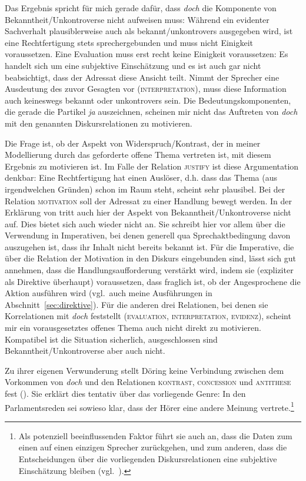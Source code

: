 {Das Ergebnis spricht für mich gerade dafür, dass \textit{doch} die Komponente von Bekanntheit/Unkontroverse nicht aufweisen muss: Während ein evidenter Sach\-verhalt plausiblerweise auch als bekannt/unkontrovers ausgegeben wird, ist eine Rechtfertigung stets sprechergebunden und muss nicht Einigkeit voraussetzen. Eine Evaluation muss erst recht keine Einigkeit voraussetzen: Es handelt sich um eine subjektive Einschätzung und es ist auch gar nicht beabsichtigt, dass der Adressat diese Ansicht teilt. Nimmt der Sprecher eine Ausdeutung des zuvor Gesagten vor (\textsc{interpretation}), muss diese Information auch keineswegs bekannt oder unkontrovers sein. Die Bedeutungskomponenten, die gerade die Partikel \textit{ja} auszeichnen, scheinen mir nicht das Auftreten von \textit{doch} mit den ge\-nannten Diskursrelationen zu motivieren. 

Die Frage ist, ob der Aspekt von Widerspruch/Kontrast, der in meiner Modellierung durch das geforderte offene Thema vertreten ist, mit diesem Ergebnis zu motivieren ist. Im Falle der Relation \textsc{justify} ist diese Argumentation denkbar: Eine Rechtfertigung hat einen Auslöser, d.h. dass das Thema (aus irgendwelchen Gründen) schon im Raum steht, scheint sehr plausibel. Bei der Relation \textsc{motivation} soll der Adressat zu einer Handlung bewegt werden. In der Erklärung von \citet[89]{Doering2014} tritt auch hier der Aspekt von Bekanntheit/Unkontroverse nicht auf. Dies bietet sich auch wieder nicht an. Sie schreibt hier vor allem über die Verwendung in Imperativen, bei denen generell qua Sprechaktbedingung davon auszugehen ist, dass ihr Inhalt nicht bereits bekannt ist. Für die Imperative, die über die Relation der Motivation in den Diskurs eingebunden sind, lässt sich gut annehmen, dass die Handlungsaufforderung verstärkt wird, indem sie (expliziter als Direktive überhaupt) voraussetzen, dass fraglich ist, ob der Angesprochene die Aktion ausführen wird (vgl.\ auch meine Ausführungen in Abschnitt~\ref{sec:direktive}). Für die anderen drei Relationen, bei denen sie Korrelationen mit \textit{doch} feststellt (\textsc{evaluation}, \textsc{interpretation}, \textsc{evidenz}), scheint mir ein vorausgesetztes offenes Thema auch nicht direkt zu motivieren. Kompatibel ist die Situation sicherlich, ausgeschlossen sind Bekanntheit\slash Unkontroverse aber auch nicht.

Zu ihrer eigenen Verwunderung stellt Döring keine Verbindung zwischen dem Vorkommen von \textit{doch} und den Relationen \textsc{kontrast}, \textsc{concession} und \textsc{antithese} fest (\citeyear[89]{Doering2014}). Sie erklärt dies tentativ über das vorliegende Genre: In den Parlamentsreden sei sowieso klar, dass der Hörer eine andere Meinung vertrete.\footnote{Als potenziell beeinflussenden Faktor führt sie auch an, dass die Daten zum einen auf einen einzigen Sprecher zurückgehen, und zum anderen, dass die Entscheidungen über die vorliegenden Diskursrelationen eine subjektive Einschätzung bleiben (vgl.\ \citealt[90]{Doering2014}).}

}
